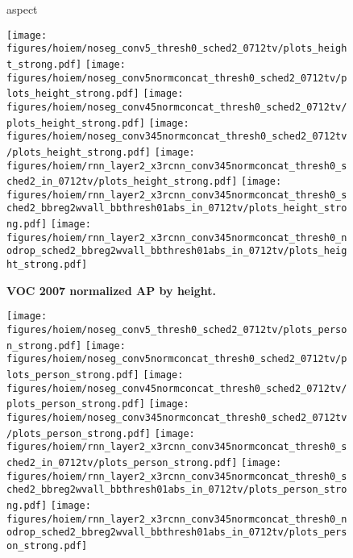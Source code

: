 \documentclass[10pt,twocolumn,letterpaper]{article}
\begin{document}
\begin{figure}[t]
\begin{center}
  \end{center}
  \vspace{-12pt}
  \caption{%
    aspect
  }
  \label{fig:hoiem}
\end{figure}\begin{figure}[t]
  \begin{center}
   \texttt{[image: figures/hoiem/noseg\_conv5\_thresh0\_sched2\_0712tv/plots\_height\_strong.pdf]}
   \texttt{[image: figures/hoiem/noseg\_conv5normconcat\_thresh0\_sched2\_0712tv/plots\_height\_strong.pdf]}
   \texttt{[image: figures/hoiem/noseg\_conv45normconcat\_thresh0\_sched2\_0712tv/plots\_height\_strong.pdf]}
   \texttt{[image: figures/hoiem/noseg\_conv345normconcat\_thresh0\_sched2\_0712tv/plots\_height\_strong.pdf]}
   \texttt{[image: figures/hoiem/rnn\_layer2\_x3rcnn\_conv345normconcat\_thresh0\_sched2\_in\_0712tv/plots\_height\_strong.pdf]}
   \texttt{[image: figures/hoiem/rnn\_layer2\_x3rcnn\_conv345normconcat\_thresh0\_sched2\_bbreg2wvall\_bbthresh01abs\_in\_0712tv/plots\_height\_strong.pdf]}
   \texttt{[image: figures/hoiem/rnn\_layer2\_x3rcnn\_conv345normconcat\_thresh0\_nodrop\_sched2\_bbreg2wvall\_bbthresh01abs\_in\_0712tv/plots\_height\_strong.pdf]}
  \end{center}
  \vspace{-12pt}
  \caption{%
    \textbf{VOC 2007 normalized AP by height.}
  }
  \label{fig:hoiem}
\end{figure}\begin{figure}[t]
  \begin{center}
   \texttt{[image: figures/hoiem/noseg\_conv5\_thresh0\_sched2\_0712tv/plots\_person\_strong.pdf]}
   \texttt{[image: figures/hoiem/noseg\_conv5normconcat\_thresh0\_sched2\_0712tv/plots\_person\_strong.pdf]}
   \texttt{[image: figures/hoiem/noseg\_conv45normconcat\_thresh0\_sched2\_0712tv/plots\_person\_strong.pdf]}
   \texttt{[image: figures/hoiem/noseg\_conv345normconcat\_thresh0\_sched2\_0712tv/plots\_person\_strong.pdf]}
   \texttt{[image: figures/hoiem/rnn\_layer2\_x3rcnn\_conv345normconcat\_thresh0\_sched2\_in\_0712tv/plots\_person\_strong.pdf]}
   \texttt{[image: figures/hoiem/rnn\_layer2\_x3rcnn\_conv345normconcat\_thresh0\_sched2\_bbreg2wvall\_bbthresh01abs\_in\_0712tv/plots\_person\_strong.pdf]}
   \texttt{[image: figures/hoiem/rnn\_layer2\_x3rcnn\_conv345normconcat\_thresh0\_nodrop\_sched2\_bbreg2wvall\_bbthresh01abs\_in\_0712tv/plots\_person\_strong.pdf]}

\end{center}
\end{figure}
\end{document}
